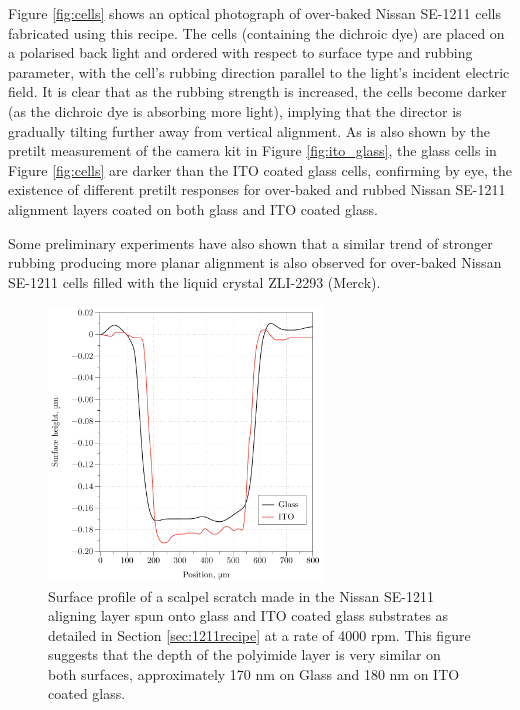 Figure \ref{fig:cells} shows an optical photograph of over-baked Nissan SE-1211 cells fabricated using this recipe. The cells (containing the dichroic dye) are placed on a polarised back light and ordered with respect to surface type and rubbing parameter, with the cell's rubbing direction parallel to the light's incident electric field. It is clear that as the rubbing strength is increased, the cells become darker (as the dichroic dye is absorbing more light), implying that the director is gradually tilting further away from vertical alignment. As is also shown by the pretilt measurement of the camera kit in Figure \ref{fig:ito_glass}, the glass cells in Figure \ref{fig:cells} are darker than the ITO coated glass cells, confirming by eye, the existence of different pretilt responses for over-baked and rubbed Nissan SE-1211 alignment layers coated on both glass and ITO coated glass.

Some preliminary experiments have also shown that a similar trend of stronger rubbing producing more planar alignment is also observed for over-baked Nissan SE-1211 cells filled with the liquid crystal ZLI-2293 (Merck).



\begin{figure}
\begin{center}
\includegraphics[width=0.65\textwidth]{Figures/Pretilt/scratch}
\end{center}
\caption[Surface profile of scratched aligning layers]{\label{fig:scratch}{Surface profile of a scalpel scratch made in the Nissan SE-1211 aligning layer spun onto glass and ITO coated glass substrates as detailed in Section \ref{sec:1211recipe} at a rate of 4000 rpm. This figure suggests that the depth of the polyimide layer is very similar on both surfaces, approximately 170 nm on Glass and 180 nm on ITO coated glass.}}
\end{figure}

